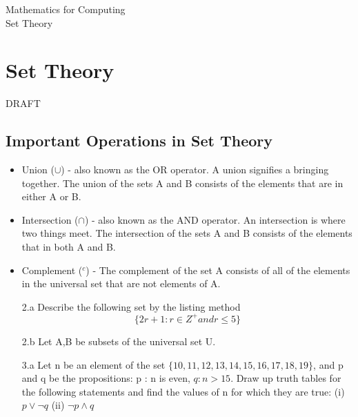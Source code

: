 \documentclass[12pt]{article}
\begin{document}
\begin{center}
\huge{Mathematics for Computing}\\
\LARGE{Set Theory}
\end{center}

\section{Set Theory}
DRAFT


\subsection{Important Operations in Set Theory}

\begin{itemize}
\item Union ($\cup$) - also known as the OR operator. A union signifies a bringing together. The union of the sets A and B consists of the elements that are in either A or B.
\item Intersection ($\cap$) - also known as the AND operator. An intersection is where two things meet. The intersection of the sets A and B consists of the elements that in both A and B.
\item Complement ($^{c}$) - The complement of the set A consists of all of the elements in the universal set that are not elements of A.
\end{itemize}

\begin{itemize}
\item[2.a] Describe the following set by the listing method
\[ \{ 2r+1 : r \in Z^{+} and r \leq 5  \} \]
\item[2.b] Let A,B be subsets of the universal set U.


\end{itemize}
\begin{itemize}
\item[3.a]
Let n be an element of the set $\{10, 11, 12, 13, 14, 15, 16, 17, 18, 19\}$,
and p and q be the propositions:
p : n is even, $q : n > 15$.
Draw up truth tables for the following statements and find the values of n for
which they are true:
(i) $p \vee \neg q$
(ii) $\neg p \wedge q$
\end{itemize}


\end{document}
